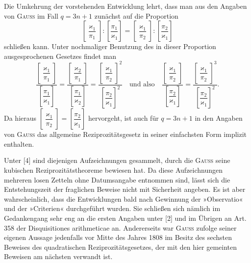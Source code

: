 
Die Umkehrung der vorstehenden Entwicklung lehrt, dass man aus den Angaben von \textsc{Gauss} im
Fall $q=3n+1$ zunächst auf die Proportion
\[
\left[\dfrac{\varkappa_1}{\pi_1}\right]:\left[\dfrac{\pi_1}{\varkappa_1}\right]=\left[\dfrac{\varkappa_1}{\pi_2}\right]:\left[\dfrac{\pi_2}{\varkappa_1}\right]
\]
schließen kann. Unter nochmaliger Benutzung des in dieser Proportion ausgesprochenen Gesetzes findet man
\[
\dfrac{\left[\dfrac{\varkappa_1}{\pi_1}\right]}{\left[\dfrac{\pi_1}{\varkappa_1}\right]}=\dfrac{\left[\dfrac{\varkappa_2}{\pi_1}\right]}{\left[\dfrac{\pi_1}{\varkappa_2}\right]}=\dfrac{\left[\dfrac{\varkappa_1}{\pi_2}\right]^2}{\left[\dfrac{\pi_2}{\varkappa_1}\right]^2}
\quad\text{und also}\quad
\dfrac{\left[\dfrac{\varkappa_1}{\pi_2}\right]}{\left[\dfrac{\pi_2}{\varkappa_1}\right]}=\dfrac{\left[\dfrac{\varkappa_1}{\pi_2}\right]^3}{\left[\dfrac{\pi_2}{\varkappa_1}\right]^2}.
\]
Da hieraus $\left[\dfrac{\varkappa_1}{\pi_2}\right]=\left[\dfrac{\pi_2}{\varkappa_1}\right]$ hervorgeht, ist auch für $q=3n+1$ in den Angaben von \textsc{Gauss} das allgemeine Reziprozitätsgesetz in seiner einfachsten Form implizit enthalten.

Unter [4] sind diejenigen Aufzeichnungen gesammelt, durch die \textsc{Gauss} seine kubischen Reziprozitätstheoreme bewiesen hat. Da diese Aufzeichnungen mehreren losen Zetteln ohne Datumsangabe entnommen sind, lässt sich die Entstehungszeit der fraglichen Beweise nicht mit Sicherheit angeben. Es ist
aber wahrscheinlich, dass die Entwicklungen bald nach Gewinnung der »Observatio« und der »Criterien«
durchgeführt wurden. Sie schließen sich nämlich im Gedankengang sehr eng an die ersten Angaben unter [2]
und im Übrigen an Art. 358 der Disquisitiones arithmeticae an. Andererseits war \textsc{Gauss} zufolge seiner
eigenen Aussage jedenfalls vor Mitte des Jahres 1808 im Besitz des sechsten Beweises des quadratischen
Reziprozitätsgesetzes, der mit den hier gemeinten Beweisen am nächsten verwandt ist.

